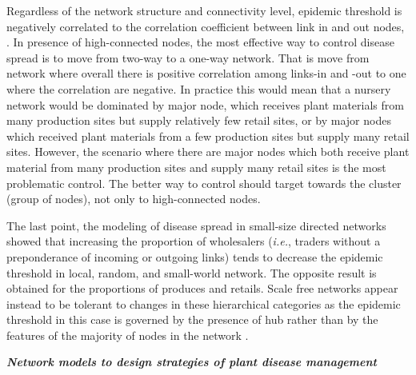 
Regardless of the network structure and connectivity level, epidemic threshold is negatively correlated to the correlation coefficient between link in and out nodes, \citep{Moslonka2008}. In presence of high-connected nodes, the most effective way to control disease spread is to move from two-way to a one-way network. That is move from network where overall there is positive correlation among links-in and -out to one where the correlation are negative. In practice this would mean that a nursery network would be dominated by major node, which receives plant materials from many production sites but supply relatively few retail sites, or by major nodes which received plant materials from a few production sites but supply many retail sites. However, the scenario where there are major nodes which both receive plant material from many production sites and supply many retail sites is the most problematic control. The better way to control should target towards the cluster (group of nodes), not only to high-connected nodes. 

The last point, the modeling of disease spread in small-size directed networks showed that increasing the proportion of wholesalers (\textit{i.e.}, traders without a preponderance of incoming or outgoing links) tends to decrease the epidemic threshold in local, random, and small-world network. The opposite result is obtained for the proportions of produces and retails. Scale free networks appear instead to be tolerant to changes in these hierarchical categories as the epidemic threshold in this case is governed by the presence of hub rather than by the features of the majority of nodes in the network \citep{Moslonka2010}.

\textit{\textbf{Network models to design strategies of plant disease management}}

